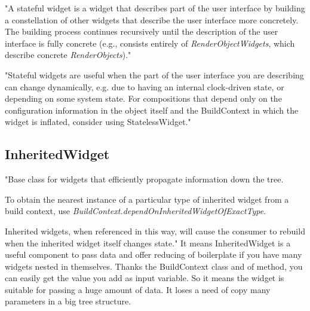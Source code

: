 "A stateful widget is a widget that describes part of the user interface by building a constellation of other widgets that describe the user interface more concretely.
The building process continues recursively until the description of the user interface is fully concrete (e.g., consists entirely of
\textit{RenderObjectWidgets}\cite{renderObjectWidget}, which describe concrete \textit{RenderObjects}\cite{renderObject})."\cite{statefulWidget}


"Stateful widgets are useful when the part of the user interface you are describing can change dynamically, e.g. due to having an internal clock-driven state, or depending on some system state.
For compositions that depend only on the configuration information in the object itself and the BuildContext in which the widget is inflated, consider using StatelessWidget."\cite{statefulWidget}


\subsection{InheritedWidget}\label{subsec:inheritedwidget}
"Base class for widgets that efficiently propagate information down the tree.

To obtain the nearest instance of a particular type of inherited widget from a build context, use \textit{BuildContext.dependOnInheritedWidgetOfExactType}\cite{dependOnInheritedWidgetOfExactType}.

Inherited widgets, when referenced in this way, will cause the consumer to rebuild when the inherited widget itself changes state."\cite{inheritedWidget}
It means InheritedWidget is a useful component to pass data and offer reducing of boilerplate if you have many widgets nested in themselves.
Thanks the BuildContext class and of method, you can easily get the value you add as input variable.
So it means the widget is suitable for passing a huge amount of data.
It loses a need of copy many parameters in a big tree structure.
